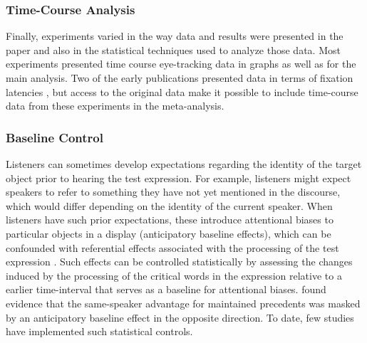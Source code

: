 \documentclass[doc,fignum,apacite,floatsintext]{apa6}
\begin{document}
\subsubsection{Time-Course Analysis}
Finally, experiments varied in the way data and results were presented in the paper and also in the statistical techniques used to analyze those data. Most experiments presented time course eye-tracking data in graphs as well as for the main analysis.  Two of the early publications presented data in terms of fixation latencies \cite{barrkeysar02,metzingbrennan03}, but access to the original data make it possible to include time-course data from these experiments in the meta-analysis.

\subsubsection{Baseline Control}
Listeners can sometimes develop expectations regarding the identity of the target object prior to hearing the test expression.  For example, listeners might expect speakers to refer to something they have not yet mentioned in the discourse, which would differ depending on the identity of the current speaker.  When listeners have such prior expectations, these introduce attentional biases to particular objects in a display (anticipatory baseline effects), which can be confounded with referential effects associated with the processing of the test expression \cite{barr08a,barrgannpierce11}.  Such effects can be controlled statistically by assessing the changes induced by the processing of the critical words in the expression relative to a earlier time-interval that serves as a baseline for attentional biases.   found evidence that the same-speaker advantage for maintained precedents was masked by an anticipatory baseline effect in the opposite direction.  To date, few studies have implemented such statistical controls.
\end{document}
